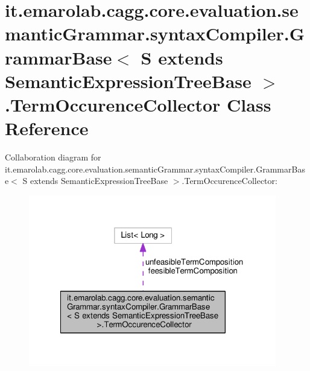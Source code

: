 \hypertarget{classit_1_1emarolab_1_1cagg_1_1core_1_1evaluation_1_1semanticGrammar_1_1syntaxCompiler_1_1Gramma8ae8fecdc099d4114647279a9237b701}{\section{it.\-emarolab.\-cagg.\-core.\-evaluation.\-semantic\-Grammar.\-syntax\-Compiler.\-Grammar\-Base$<$ S extends Semantic\-Expression\-Tree\-Base $>$.Term\-Occurence\-Collector Class Reference}
\label{classit_1_1emarolab_1_1cagg_1_1core_1_1evaluation_1_1semanticGrammar_1_1syntaxCompiler_1_1Gramma8ae8fecdc099d4114647279a9237b701}
}


Collaboration diagram for it.\-emarolab.\-cagg.\-core.\-evaluation.\-semantic\-Grammar.\-syntax\-Compiler.\-Grammar\-Base$<$ S extends Semantic\-Expression\-Tree\-Base $>$.Term\-Occurence\-Collector\-:\nopagebreak
\begin{figure}[H]
\begin{center}
\leavevmode
\includegraphics[width=307pt]{classit_1_1emarolab_1_1cagg_1_1core_1_1evaluation_1_1semanticGrammar_1_1syntaxCompiler_1_1Gramma57fc47999fed9345bd4cef023b83caf0}
\end{center}
\end{figure}

